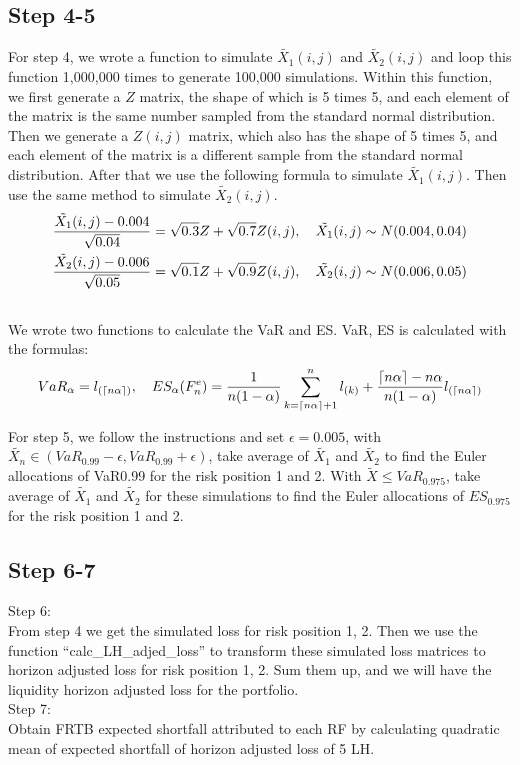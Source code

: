 \documentclass{article}
\begin{document}
\subsection*{Step 4-5}
For step 4, we wrote a function to simulate $\tilde {X_1}(i,j)$ and $\tilde {X_2}(i,j)$ and loop this function 1,000,000 times to generate 100,000 simulations. 
Within this function, we first generate a $Z$ matrix, the shape of which is 5 times 5, and each element of the matrix is the same number sampled from the standard normal distribution. Then we generate a $Z(i,j)$ matrix, which also has the shape of 5 times 5, and each element of the matrix is a different sample from the standard normal distribution. After that we use the following formula to simulate $\tilde {X_1}(i,j)$. Then use the same method to simulate $\tilde {X_2}(i,j)$.
\begin{equation}
  \begin{aligned}
\frac {\tilde {X_1}(i,j)-0.004} {\sqrt{0.04}} = \sqrt{0.3}Z+\sqrt{0.7}Z(i,j) , \quad\tilde {X_1}(i,j) \sim N (0.004,0.04)\\
\frac {\tilde {X_2}(i,j)-0.006} {\sqrt{0.05}} = \sqrt{0.1}Z+\sqrt{0.9}Z(i,j) , \quad\tilde {X_2}(i,j) \sim N (0.006,0.05)\\
\notag
  \end{aligned}
\end{equation}
We wrote two functions to calculate the VaR and ES.
VaR, ES is calculated with the formulas:
$$
VaR_\alpha = l_{(\lceil n\alpha \rceil)}, \quad
ES_{\alpha}(F_n^e) = \frac {1} {n(1-\alpha)} \sum ^n_{k=\lceil n\alpha \rceil + 1} l_{(k)} + \frac {\lceil n\alpha \rceil - n\alpha} {n(1-\alpha)} l_{(\lceil n\alpha \rceil)}
\notag
$$

\noindent For step 5, we follow the instructions and set $\epsilon = 0.005$, with $\tilde {X_n} \in (VaR_{0.99} - \epsilon, VaR_{0.99} + \epsilon)$, take average of $\tilde {X_1}$ and $\tilde {X_2}$ to find the Euler allocations of
VaR0.99 for the risk position 1 and 2.
With $\tilde {X} \leq VaR_{0.975}$,  take average of $\tilde {X_1}$ and $\tilde {X_2}$ for these simulations to find the Euler allocations of $ES_{0.975}$ for the risk position 1 and 2.
\subsection*{Step 6-7}
Step 6:\\
From step 4 we get the simulated loss for risk position 1, 2. Then we use the function “calc\_LH\_adjed\_loss” to transform these simulated loss matrices to horizon adjusted loss for risk position 1, 2. Sum them up, and we will have the liquidity horizon adjusted loss for the portfolio.
\\Step 7:\\
Obtain FRTB expected shortfall attributed to each RF by calculating quadratic mean of expected shortfall of horizon adjusted loss of 5 LH.
\end{document}
